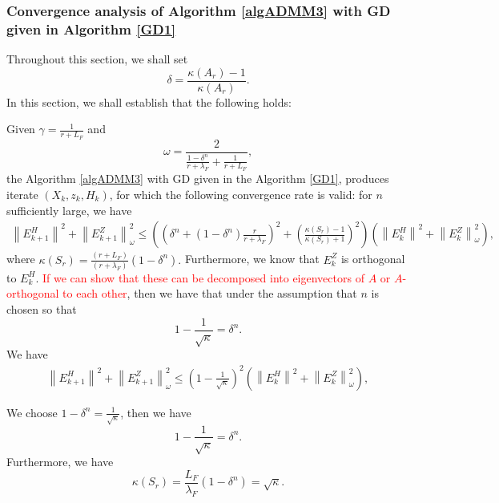 \subsubsection{Convergence analysis of Algorithm \ref{algADMM3} with GD given in Algorithm \ref{GD1}}
Throughout this section, we shall set 
\begin{equation}
\delta = \frac{\kappa(A_r)-1}{\kappa(A_r)}. 
\end{equation} 
In this section, we shall establish that the following holds: 
\begin{theorem}\label{main:theorem04} 
Given $\gamma = \frac{1}{r + L_F}$ and \begin{equation}
\omega = \frac{2}{\frac{1 - \delta^n}{r + \lambda_F} + \frac{1}{r+L_F}}, 
\end{equation}
the Algorithm \ref{algADMM3} with GD given in the Algorithm \ref{GD1}, produces iterate $(X_k, z_k, H_k)$, for which the following convergence rate is valid: for $n$ sufficiently large, we have 
\begin{eqnarray*}
\left \|E_{k+1}^H \right \|^2 + \left \|E_{k+1}^Z \right \|_\omega^2 \leq \left ( \left ( \delta^n + (1 - \delta^n) \frac{r}{r+\lambda_F} \right )^2  + \left ( \frac{\kappa(S_r) - 1}{\kappa(S_r) + 1} \right )^2 \right ) \left (\left \|E_{k}^H \right \|^2 + \left \|E_{k}^Z \right \|_\omega^2 \right ), 
\end{eqnarray*}
where $\kappa(S_r) = \frac{(r+L_F)}{(r+\lambda_F)}(1 - \delta^n).$ Furthermore, we know that $E_k^Z$ is orthogonal to $E_k^H$. \textcolor{red}{If we can show that these can be decomposed into eigenvectors of $A$ or $A$-orthogonal to each other}, then we have that under the assumption that $n$ is chosen so that 
\begin{equation}
1 - \frac{1}{\sqrt{\kappa}} = \delta^n. 
\end{equation}
We have 
\begin{eqnarray*}
\left \|E_{k+1}^H \right \|^2 + \left \|E_{k+1}^Z \right \|_\omega^2 \leq 
\left ( 1 - \frac{1}{\sqrt{\kappa}} \right )^2  \left (\left \|E_{k}^H \right \|^2 + \left \|E_{k}^Z \right \|_\omega^2 \right ), 
\end{eqnarray*}
\end{theorem}
We choose $1 - \delta^n = \frac{1}{\sqrt{\kappa}}$, then we have 
\begin{equation}
1 - \frac{1}{\sqrt{\kappa}} = \delta^n. 
\end{equation}
Furthermore, we have 
\begin{equation}
\kappa(S_r) = \frac{L_F}{\lambda_F}(1 - \delta^n) = \sqrt{\kappa}. 
\end{equation}
